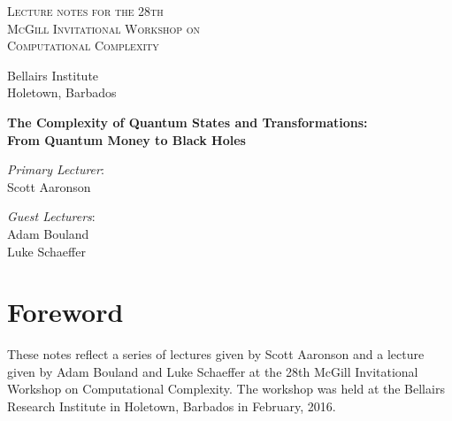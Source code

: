 \documentclass[11pt]{report}
\theoremstyle{plain}
\theoremstyle{definition}
\begin{document}
\begin{titlepage}
\begin{center}
\begin{huge}
\textsc{Lecture notes for the 28th\\ McGill Invitational Workshop on\\
Computational Complexity\\}
\end{huge}
\vspace{1.5cm}

\begin{Large}
Bellairs Institute\\
Holetown, Barbados

\vspace{2.5cm}
{\bf The Complexity of Quantum States and Transformations: \\ From Quantum Money to Black Holes}

\vspace{2cm}
\emph{Primary Lecturer}:\\
Scott Aaronson

\vspace{1cm}
\emph{Guest Lecturers}:\\
Adam Bouland\\
Luke Schaeffer
\end{Large}
\end{center}
\end{titlepage}

\newpage

\tableofcontents

\newpage

\chapter*{Foreword}
These notes reflect a series of lectures given by Scott Aaronson and
a lecture given by Adam Bouland and Luke Schaeffer at the 28th McGill Invitational Workshop on
Computational Complexity. The workshop was held at the Bellairs
Research Institute in Holetown, Barbados in February, 2016.

\newpage
\end{document}
